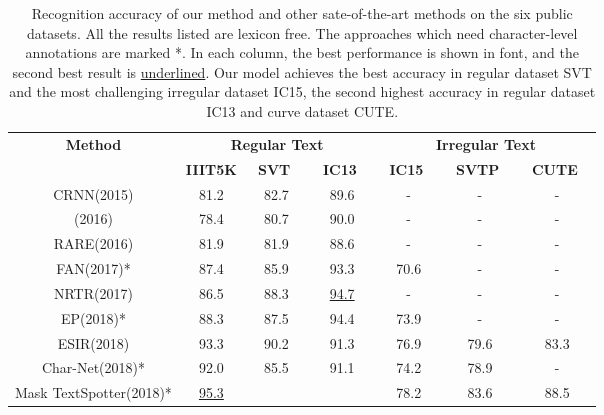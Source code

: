 \documentclass[runningheads]{llncs}
\begin{document}
\begin{table}[]
\vspace{-0.3cm} 
\caption{Recognition accuracy of our method and other sate-of-the-art methods on the six public datasets. All the results listed are lexicon free. The approaches which need character-level annotations are marked *. In each column, the best performance is shown in  font, and the second best result is  \underline{underlined}. Our model achieves the best accuracy in regular dataset SVT and the most challenging irregular dataset IC15, the second highest accuracy in regular dataset IC13 and curve dataset CUTE.}
\label{tab2}
\centering
\begin{tabular}{|c|c|c|c|c|c|c|}
\hline
\multirow{2}{*}{\textbf{Method}} & \multicolumn{3}{c|}{\textbf{Regular Text}}     & \multicolumn{3}{c|}{\textbf{Irregular Text}}  \\ \cline{2-7} 
                                 & \textbf{IIIT5K} & \ \textbf{SVT} \  & \ \textbf{IC13} \  & \ \textbf{IC15} \ &  \ \textbf{SVTP} \ &  \ \textbf{CUTE} \ \\ \hline
CRNN(2015)\cite{shi2016end}                     &   81.2           &  82.7          &  89.6         & -             & -             & -             \\
(2016)\cite{lee2016recursive}         & 78.4            & 80.7         & 90.0          &  -          & -         &  -          \\
RARE(2016)\cite{shi2016robust}         & 81.9            & 81.9         & 88.6          &  -          & -         &  -          \\
FAN(2017)\cite{cheng2017focusing}*                    & 87.4            & 85.9         & 93.3          &  70.6          & -         &  -          \\
NRTR(2017)\cite{sheng2019nrtr}                     & 86.5            & 88.3         &  \underline{94.7}          & -             & -             & -             \\
EP(2018)\cite{bai2018edit}*         & 88.3            & 87.5         & 94.4          &  73.9          & -         &  -          \\
ESIR(2018)\cite{zhan2019esir}                    & 93.3            & 90.2         & 91.3          & 76.9          & 79.6          & 83.3          \\
Char-Net(2018)\cite{liu2018char}*                 & 92.0            & 85.5         & 91.1          & 74.2          & 78.9          & -             \\
Mask TextSpotter(2018)\cite{liao2019mask}*         & \underline{95.3}           &          &           & 78.2          & 83.6          & 88.5          \\

\end{tabular}
\end{table}
\end{document}
